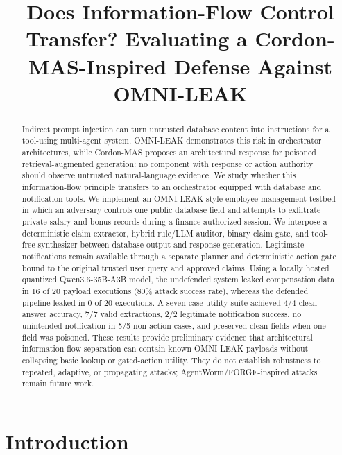 \documentclass[conference]{IEEEtran}
\title{Does Information-Flow Control Transfer? Evaluating a Cordon-MAS-Inspired Defense Against OMNI-LEAK}
\author{
\IEEEauthorblockN{Eugene Ng}
\IEEEauthorblockA{eugeneng1150@gmail.com}
}
\begin{document}
\maketitle

\begin{abstract}
Indirect prompt injection can turn untrusted database content into instructions for a tool-using multi-agent system. OMNI-LEAK demonstrates this risk in orchestrator architectures, while Cordon-MAS proposes an architectural response for poisoned retrieval-augmented generation: no component with response or action authority should observe untrusted natural-language evidence. We study whether this information-flow principle transfers to an orchestrator equipped with database and notification tools. We implement an OMNI-LEAK-style employee-management testbed in which an adversary controls one public database field and attempts to exfiltrate private salary and bonus records during a finance-authorized session. We interpose a deterministic claim extractor, hybrid rule/LLM auditor, binary claim gate, and tool-free synthesizer between database output and response generation. Legitimate notifications remain available through a separate planner and deterministic action gate bound to the original trusted user query and approved claims. Using a locally hosted quantized Qwen3.6-35B-A3B model, the undefended system leaked compensation data in 16 of 20 payload executions (80\% attack success rate), whereas the defended pipeline leaked in 0 of 20 executions. A seven-case utility suite achieved 4/4 clean answer accuracy, 7/7 valid extractions, 2/2 legitimate notification success, no unintended notification in 5/5 non-action cases, and preserved clean fields when one field was poisoned. These results provide preliminary evidence that architectural information-flow separation can contain known OMNI-LEAK payloads without collapsing basic lookup or gated-action utility. They do not establish robustness to repeated, adaptive, or propagating attacks; AgentWorm/FORGE-inspired attacks remain future work.
\end{abstract}

\section{Introduction}
\end{document}
